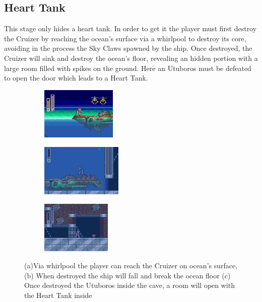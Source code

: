 \subsection{Heart Tank}
This stage only hides a heart tank. In order to get it the player must first destroy the Cruizer by reaching the ocean's surface via a whirlpool to destroy its core, avoiding in the process the Sky Claws spawned by the ship. Once destroyed, the Cruizer will sink and  destroy the ocean's floor, revealing an hidden portion with a large room filled with spikes on the ground. Here an Utuboros  must be defeated to open the door which leads to a Heart Tank. 
\begin{figure}[htp]
	\centering
	\begin{subfigure}{0.32\textwidth}
		\centering
		\includegraphics[height=2.5cm]{figures/X1/Launch_octopus/Octopus_heart_1.jpg}
		\caption{}
	\end{subfigure}
	\begin{subfigure}{0.32\textwidth}
		\centering
		\includegraphics[height=2.5cm]{figures/X1/Launch_octopus/Octopus_heart_2.jpg}
		\caption{}
	\end{subfigure}
	\begin{subfigure}{0.32\textwidth}
		\centering
		\includegraphics[height=2.5cm]{figures/X1/Launch_octopus/Octopus_heart_3.jpg}
		\caption{}
	\end{subfigure}
	\caption{(a)Via whirlpool the player can reach the Cruizer on ocean's surface,(b) When destroyed the ship will fall and break the ocean floor (c) Once destroyed the Utuboros inside the cave, a room will open with the Heart Tank inside}
\end{figure}

